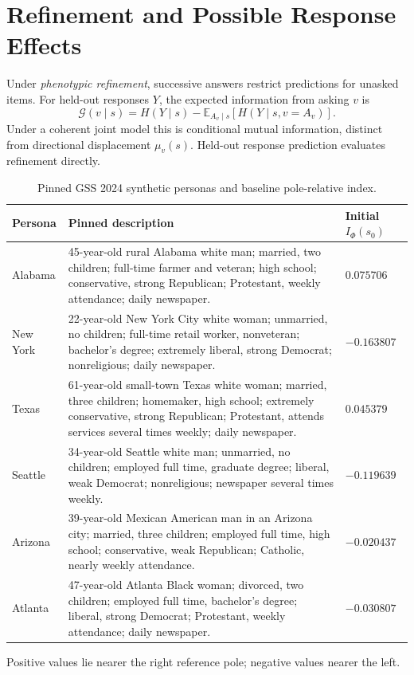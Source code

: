 \documentclass[technote,10pt]{IEEEtran}
\newcommand{\EE}{\mathbb{E}}
\begin{document}
\section{Refinement and Possible Response Effects}
Under \emph{phenotypic refinement}, successive answers restrict predictions for unasked items. For held-out responses $Y$, the expected information from asking $v$ is
\begin{equation}
\mathcal G(v\mid s)=
H(Y\mid s)-\EE_{A_v\mid s}[H(Y\mid s,v=A_v)].
\label{eq:ig}
\end{equation}
Under a coherent joint model this is conditional mutual information, distinct from directional displacement $\mu_v(s)$. Held-out response prediction evaluates refinement directly.

\begin{table}[!t]
\centering
\caption{Pinned GSS 2024 synthetic personas and baseline pole-relative index.}
\label{tab:personas}
\begingroup
\small
\footnotesize
\renewcommand{\arraystretch}{1.06}
\begin{tabularx}{\textwidth}{@{}p{.75in}X>{\raggedleft\arraybackslash}p{.90in}@{}}
\toprule
\textbf{Persona} & \textbf{Pinned description} & \textbf{Initial $I_\Phi(s_0)$} \\
\midrule
Alabama & 45-year-old rural Alabama white man; married, two children; full-time farmer and veteran; high school; conservative, strong Republican; Protestant, weekly attendance; daily newspaper. & $0.075706$ \\
\addlinespace[2pt]
New York & 22-year-old New York City white woman; unmarried, no children; full-time retail worker, nonveteran; bachelor's degree; extremely liberal, strong Democrat; nonreligious; daily newspaper. & $-0.163807$ \\
\addlinespace[2pt]
Texas & 61-year-old small-town Texas white woman; married, three children; homemaker, high school; extremely conservative, strong Republican; Protestant, attends services several times weekly; daily newspaper. & $0.045379$ \\
\addlinespace[2pt]
Seattle & 34-year-old Seattle white man; unmarried, no children; employed full time, graduate degree; liberal, weak Democrat; nonreligious; newspaper several times weekly. & $-0.119639$ \\
\addlinespace[2pt]
Arizona & 39-year-old Mexican American man in an Arizona city; married, three children; employed full time, high school; conservative, weak Republican; Catholic, nearly weekly attendance. & $-0.020437$ \\
\addlinespace[2pt]
Atlanta & 47-year-old Atlanta Black woman; divorced, two children; employed full time, bachelor's degree; liberal, strong Democrat; Protestant, weekly attendance; daily newspaper. & $-0.030807$ \\
\bottomrule
\end{tabularx}
\endgroup
\vspace{2pt}

{\footnotesize\raggedright Positive values lie nearer the right reference pole; negative values nearer the left.\par}
\end{table}
\end{document}
